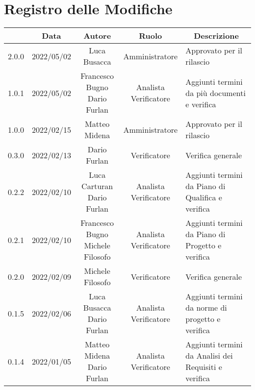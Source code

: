 \thispagestyle{empty}
\section*{Registro delle Modifiche}

\begin{center}
	\renewcommand{\arraystretch}{1.8}
	\begin{longtable}[c]{c | c | c | c | p{5cm}}
		\rowcolor[HTML]{125E28}
		\multicolumn{1}{c}{\color[HTML]{FFFFFF} \textbf{Versione}} & 
		\multicolumn{1}{c}{\color[HTML]{FFFFFF} \textbf{Data}} & 
		\multicolumn{1}{c}{\color[HTML]{FFFFFF} \textbf{Autore}} & 
		\multicolumn{1}{c}{\color[HTML]{FFFFFF} \textbf{Ruolo}} & 
		\multicolumn{1}{c}{\color[HTML]{FFFFFF} \textbf{Descrizione}} \\
		\endhead
		2.0.0 & 2022/05/02 & Luca Busacca &Amministratore & Approvato per il rilascio\\
		1.0.1 & 2022/05/02 & \Shortunderstack{Francesco Bugno\\Dario Furlan} & \Shortunderstack{Analista\\Verificatore} & Aggiunti termini da più documenti e verifica\\
		1.0.0 & 2022/02/15 & Matteo Midena & Amministratore & Approvato per il rilascio\\
		0.3.0 & 2022/02/13 & Dario Furlan & Verificatore & Verifica generale\\
		0.2.2 & 2022/02/10 & \Shortunderstack{Luca Carturan\\Dario Furlan} & \Shortunderstack{Analista\\Verificatore} & Aggiunti termini da Piano di Qualifica e verifica\\
		0.2.1 & 2022/02/10 & \Shortunderstack{Francesco Bugno\\Michele Filosofo} & \Shortunderstack{Analista\\Verificatore}	& Aggiunti termini da Piano di Progetto e verifica\\
		0.2.0 & 2022/02/09 & Michele Filosofo & Verificatore & Verifica generale\\
		0.1.5 & 2022/02/06 & \Shortunderstack{Luca Busacca\\Dario Furlan} & \Shortunderstack{Analista\\Verificatore} & Aggiunti termini da norme di progetto e verifica\\
		0.1.4 & 2022/01/05 & \Shortunderstack{Matteo Midena\\Dario Furlan} & \Shortunderstack{Analista\\Verificatore} & Aggiunti termini da Analisi dei Requisiti e verifica\\

\end{longtable}
\end{center}
